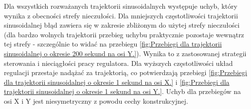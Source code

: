 \noindent Dla wszystkich rozważanych trajektorii sinusoidalnych występuje uchyb, który wynika z obecności strefy nieczułości. Dla mniejszych częstotliwości trajektorii sinusoidalnej błąd zawiera się w zakresie zbliżonym do użytej strefy nieczułości (dla bardzo wolnych trajektorii przebieg uchybu praktycznie pozostaje wewnątrz tej strefy - szczególnie to widać na przebiegu \ref{fig:Przebiegi dla trajektorii sinusoidalnej o okresie 200 sekund na osi Y.}). Wynika to z zastosowanej strategii sterowania i nieciągłości pracy regulatora. Dla wyższych częstotliwości układ regulacji przestaje nadążać za trajektorią, co potwierdzają przebiegi \ref{fig:Przebiegi dla trajektorii sinusoidalnej o okresie 1 sekund na osi X.} i \ref{fig:Przebiegi dla trajektorii sinusoidalnej o okresie 1 sekund na osi Y.}. Uchyb dla przebiegów na osi X i Y jest niesymetryczny z powodu cechy konstrukcyjnej.




